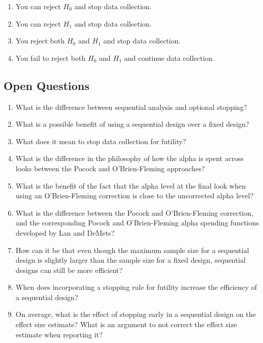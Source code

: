 \documentclass[
  oneside]{krantz}
\providecommand{\tightlist}{%
  \setlength{\itemsep}{0pt}\setlength{\parskip}{0pt}}
\begin{document}
\begin{enumerate}
\def\labelenumi{\Alph{enumi})}
\tightlist
\item
  You can reject \(H_0\) and stop data collection.
\item
  You can reject \(H_1\) and stop data collection.
\item
  You reject both \(H_0\) and \(H_1\) and stop data collection.
\item
  You fail to reject both \(H_0\) and \(H_1\) and continue data collection.
\end{enumerate}

\hypertarget{open-questions-8}{%
\subsection{Open Questions}\label{open-questions-8}}

\begin{enumerate}
\def\labelenumi{\arabic{enumi}.}
\item
  What is the difference between sequential analysis and optional stopping?
\item
  What is a possible benefit of using a sequential design over a fixed design?
\item
  What does it mean to stop data collection for futility?
\item
  What is the difference in the philosophy of how the alpha is spent across looks between the Pocock and O'Brien-Fleming approaches?
\item
  What is the benefit of the fact that the alpha level at the final look when using an O'Brien-Fleming correction is close to the uncorrected alpha level?
\item
  What is the difference between the Pocock and O'Brien-Fleming correction, and the corresponding Pocock and O'Brien-Fleming alpha spending functions developed by Lan and DeMets?
\item
  How can it be that even though the maximum sample size for a sequential design is slightly larger than the sample size for a fixed design, sequential designs can still be more efficient?
\item
  When does incorporating a stopping rule for futility increase the efficiency of a sequential design?
\item
  On average, what is the effect of stopping early in a sequential design on the effect size estimate? What is an argument to not correct the effect size estimate when reporting it?
\end{enumerate}
\end{document}
